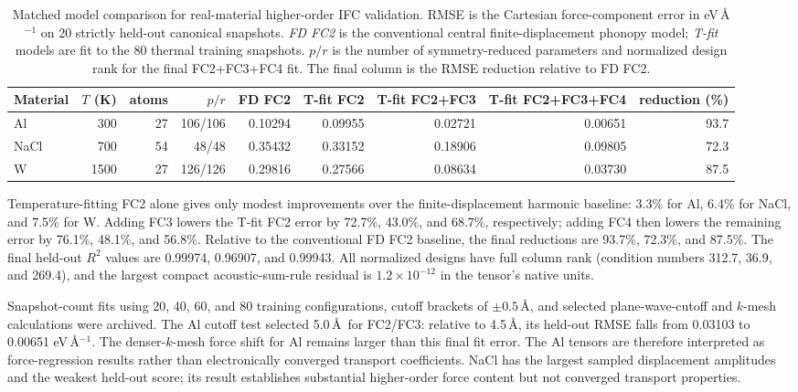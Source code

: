 \documentclass[aps,prb,reprint,amsmath,amssymb,floatfix]{revtex4-2}
\begin{document}
\color{revisionblue}
\begin{table}[htbp]
\color{black}

\color{revisionblue}
\caption{Matched model comparison for real-material higher-order IFC
validation. RMSE is the Cartesian force-component error in
eV\,\AA\(^{-1}\) on 20 strictly held-out canonical snapshots.
\emph{FD FC2} is the conventional central finite-displacement phonopy model;
\emph{T-fit} models are fit to the 80 thermal training snapshots. \(p/r\) is
the number of symmetry-reduced parameters and normalized design rank for the
final FC2+FC3+FC4 fit. The final column is the RMSE reduction relative to
FD FC2.}
\begin{ruledtabular}
\begin{tabular}{lrrrrrrrr}
Material & \(T\) (K) & atoms & \(p/r\) & FD FC2 &
T-fit FC2 & T-fit FC2+FC3 & T-fit FC2+FC3+FC4 & reduction (\%) \\
\hline
Al   & 300  & 27 & 106/106 & 0.10294 & 0.09955 & 0.02721 & 0.00651 & 93.7 \\
NaCl & 700  & 54 &  48/48  & 0.35432 & 0.33152 & 0.18906 & 0.09805 & 72.3 \\
W    & 1500 & 27 & 126/126 & 0.29816 & 0.27566 & 0.08634 & 0.03730 & 87.5 \\
\end{tabular}
\end{ruledtabular}
\label{tab:ifc34}
\color{black}

\color{revisionblue}
\end{table}
\color{black}

\color{revisionblue}
Temperature-fitting FC2 alone gives only modest improvements over the
finite-displacement harmonic baseline: 3.3\% for Al, 6.4\% for NaCl, and
7.5\% for W.  Adding FC3 lowers the T-fit FC2 error by 72.7\%, 43.0\%, and
68.7\%, respectively; adding FC4 then lowers the remaining error by 76.1\%,
48.1\%, and 56.8\%.  Relative to the conventional FD FC2 baseline, the final
reductions are 93.7\%, 72.3\%, and 87.5\%.  The final held-out \(R^2\) values
are 0.99974, 0.96907, and 0.99943.  All normalized designs have full column
rank (condition numbers 312.7, 36.9, and 269.4), and the largest compact
acoustic-sum-rule residual is \(1.2\times10^{-12}\) in the tensor's native
units.
\color{black}

\color{revisionblue}
Snapshot-count fits using 20, 40, 60, and 80 training configurations, cutoff
brackets of \(\pm0.5\)\,\AA, and selected plane-wave-cutoff and
\(k\)-mesh calculations were archived.  The Al cutoff test selected
5.0\,\AA\ for FC2/FC3: relative to 4.5\,\AA, its held-out RMSE falls
from 0.03103 to 0.00651 eV\,\AA\(^{-1}\).  The denser-\(k\)-mesh force
shift for Al remains larger than this final fit error. The Al tensors are
therefore interpreted as force-regression results rather than electronically
converged transport coefficients.  NaCl has
the largest sampled displacement amplitudes and the weakest held-out score;
its result establishes substantial higher-order force content but not
converged transport properties.
\color{black}
\end{document}
